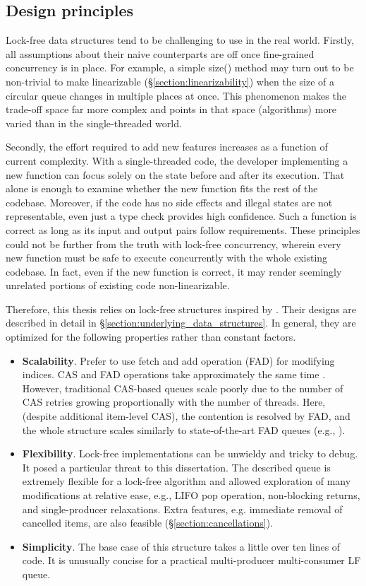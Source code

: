 \documentclass[12pt,a4paper,twoside]{report}
\begin{document}
\subsection{Design principles}
\label{section:lock-free-design-principles}

Lock-free data structures tend to be challenging to use in the real world. Firstly, all assumptions about their naive counterparts are off once fine-grained concurrency is in place. For example, a simple size() method may turn out to be non-trivial to make linearizable (\S\ref{section:linearizability}) when the size of a circular queue changes in multiple places at once. This phenomenon makes the trade-off space far more complex and points in that space (algorithms) more varied than in the single-threaded world.

Secondly, the effort required to add new features increases as a function of current complexity. With a single-threaded code, the developer implementing a new function can focus solely on the state before and after its execution. That alone is enough to examine whether the new function fits the rest of the codebase. Moreover, if the code has no side effects and illegal states are not representable, even just a type check provides high confidence. Such a function is correct as long as its input and output pairs follow requirements. These principles could not be further from the truth with lock-free concurrency, wherein every new function must be safe to execute concurrently with the whole existing codebase. In fact, even if the new function is correct, it may render seemingly unrelated portions of existing code non-linearizable. 


Therefore, this thesis relies on lock-free structures inspired by \citet{Kappes2021}. Their designs are described in detail in \S\ref{section:underlying_data_structures}. In general, they are optimized for the following properties rather than constant factors.  
\begin{itemize}
    \item \textbf{Scalability}. Prefer to use fetch and add operation (FAD) for modifying indices. CAS and FAD operations take approximately the same time \cite{fad-cas-speed}. However, traditional CAS-based queues scale poorly due to the number of CAS retries growing proportionally with the number of threads. Here, (despite additional item-level CAS), the contention is resolved by FAD, and the whole structure scales similarly to state-of-the-art FAD queues (e.g., \cite{Yang2016}).
    \item \textbf{Flexibility}. Lock-free implementations can be unwieldy and tricky to debug. It posed a particular threat to this dissertation. The described queue is extremely flexible for a lock-free algorithm and allowed exploration of many modifications at relative ease, e.g., LIFO pop operation, non-blocking returns, and single-producer relaxations. Extra features, e.g. immediate removal of cancelled items, are also feasible (\S\ref{section:cancellations}).
    \item \textbf{Simplicity}. The base case of this structure takes a little over ten lines of code. It is unusually concise for a practical multi-producer multi-consumer LF queue. 
\end{itemize}
\end{document}
